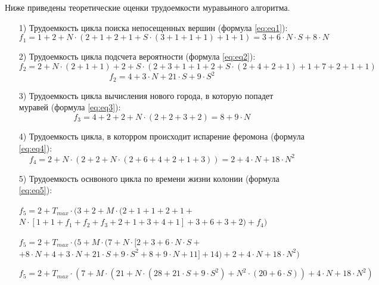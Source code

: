 \documentclass[12pt]{report}
\begin{document}
Ниже приведены теоретические оценки трудоемкости муравьиного алгоритма.

\begin{enumerate}
	\item[1)] Трудоемкость цикла поиска непосещенных вершин (формула \ref{eq:eq1}):
	\begin{equation}
		\label{eq:eq1}
		f_1 = 1 + 2 + N \cdot (2 + 1 + 2 + 1 + S \cdot (3 + 1 + 1 + 1) + 1 + 1) = 3 + 6 \cdot N \cdot S + 8 \cdot N
	\end{equation}
	
	\item[2)]
	Трудоемкость цикла подсчета вероятности (формула \ref{eq:eq2}):
	$$f_2 = 2 + N \cdot (2 + 1 + 1) + 2 + S \cdot (2 + 3 + 1 + 1 + 2 + S \cdot (2 + 4 + 2 + 1) + 1 + 7 + 2 + 1 + 1) $$
	\begin{equation}
		\label{eq:eq2}
		f_2 = 4 + 3 \cdot N + 21 \cdot S + 9 \cdot S^{2}
	\end{equation}
	
	\item[3)]
	Трудоемкость цикла вычисления нового города, в которую попадет муравей (формула \ref{eq:eq3}):
	\begin{equation}
		\label{eq:eq3}
		f_3 = 4 + 2 + 2 + N \cdot (2 + 2 + 3 + 2) = 8 + 9 \cdot N
	\end{equation}
	
	\item[4)]
	Трудоемкость цикла, в которром происходит испарение феромона (формула \ref{eq:eq4}):
	\begin{equation}
		\label{eq:eq4}
		f_4 = 2 + N \cdot (2 + 2 + N \cdot (2 + 6 + 4 + 2 + 1 + 3)) = 2 + 4 \cdot N + 18 \cdot N^{2}
	\end{equation}
	
	\item[5)]
	Трудоемкость оснвоного цикла по времени жизни колонии (формула \ref{eq:eq5}):
	
	\begin{center}
		$f_5 = 2 + T_{max} \cdot (3 + 2 + M \cdot (2 + 1 + 1 + 2 + 1 +$
		$N \cdot [1 + 1 + f_1 + f_2 + f_3 + 2 + 1 + 3 + 4 + 1] + 3 
		+ 6 + 3 + 2) + f_4)$
	\end{center}
	
	\begin{center}
		$f_5 = 2 + T_{max} \cdot (5 + M \cdot (7 + N \cdot [2 + 3 + 6 \cdot N \cdot S +$
		$ + 8 \cdot N + 4 + 3 \cdot N + 21 \cdot S + 9 \cdot S^{2} + 8 + 9 \cdot N + 11] + 14) + 2 + 4 \cdot N + 18 \cdot N^{2})$
	\end{center}
	
	\begin{equation}
		\label{eq:eq5}
		f_5 = 2 + T_{max} \cdot (7 + M \cdot (21 + N \cdot (28 + 21 \cdot S + 9 \cdot S^{2}) + N^{2} \cdot (20 + 6 \cdot S)) + 4 \cdot N + 18 \cdot N^{2})
	\end{equation}
	
\end{enumerate}
\end{document}
